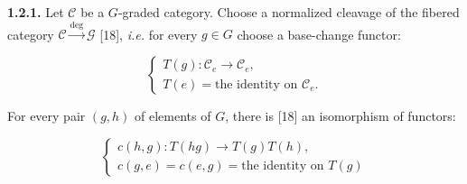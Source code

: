 \noindent\textbf{1.2.1.}\quad
Let $\mathcal C$ be a $G$-graded category. Choose a normalized cleavage of
the fibered category $\mathcal C\xrightarrow{\deg}\mathcal G$ [18],
\emph{i.e.} for every $g\in G$ choose a base-change functor:

\begingroup
\makeatletter
\tagsleft@true
\let\veqno\@@leqno
\makeatother
\begin{equation}
  \begin{cases}
    T(g)\colon\mathcal C_e\longrightarrow\mathcal C_e,\\[0.4em]
    T(e)=\text{the identity on }\mathcal C_e.
  \end{cases}
  \tag{1.2.1.1}
\end{equation}
\endgroup

For every pair $(g,h)$ of elements of $G$, there is [18] an isomorphism of
functors:

\begingroup
\makeatletter
\tagsleft@true
\let\veqno\@@leqno
\makeatother
\begin{equation}
  \begin{cases}
    c(h,g)\colon T(hg)\longrightarrow T(g)T(h),\\[0.4em]
    c(g,e)=c(e,g)=\text{the identity on }T(g)
  \end{cases}
  \tag{1.2.1.2}
\end{equation}
\endgroup
